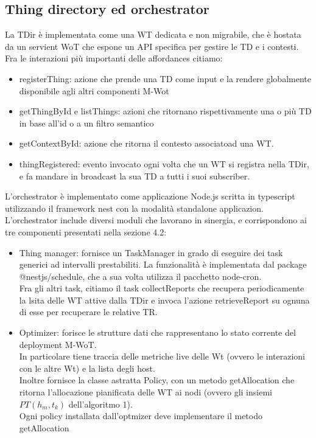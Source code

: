 \documentclass[11pt]{article}
\begin{document}
	\subsection{Thing directory ed orchestrator}
	La TDir è implementata come una WT dedicata e non migrabile, che è hostata da un servient WoT che espone un API specifica per gestire le TD e i contesti. \\
	Fra le interazioni più importanti delle affordances citiamo:
	\begin{itemize}
		\item registerThing: azione che prende una TD come input e la rendere globalmente disponibile agli altri componenti M-Wot
		\item getThingById e listThings: azioni che ritornano rispettivamente una o più TD in base all'id o a un filtro semantico
		\item getContextById: azione che ritorna il contesto associatoad una WT.
		\item thingRegistered: evento invocato ogni volta che un WT si registra nella TDir, e fa mandare in broadcast  la sua TD a tutti i suoi subscriber.
	\end{itemize}
	L'orchestrator è implementato come applicazione Node.js scritta in typescript utilizzando il framework nest con la modalità standalone applicazion. \\
	L'orchestrator include diversi moduli che lavorano in sinergia, e corrispondono ai tre componenti presentati nella sezione 4.2:
	\begin{itemize}
		\item Thing manager: fornisce un TaskManager in grado di eseguire dei task generici ad intervalli prestabiliti. La funzionalità è implementata dal package @nestjs/schedule, che a sua volta utilizza il pacchetto node-cron. \\
		Fra gli altri task, citiamo il task collectReports che recupera periodicamente la lsita delle WT attive dalla TDir e invoca l'azione retrieveReport su ognuna di esse per recuperare le relative TR.
		\item Optimizer: forisce le strutture dati che rappresentano lo stato corrente del deployment M-WoT. \\
		In particolare tiene traccia delle metriche live delle Wt (ovvero le interazioni con le altre Wt) e la lista degli host. \\
		Inoltre fornisce la classe astratta Policy, con un metodo getAllocation che ritorna l'allocazione pianificata delle WT ai nodi (ovvero gli insiemi $PT(h_m, t_k)$ dell'algoritmo 1). \\
		Ogni policy installata dall'optmizer deve implementare il metodo getAllocation 
	\end{itemize}
\end{document}
